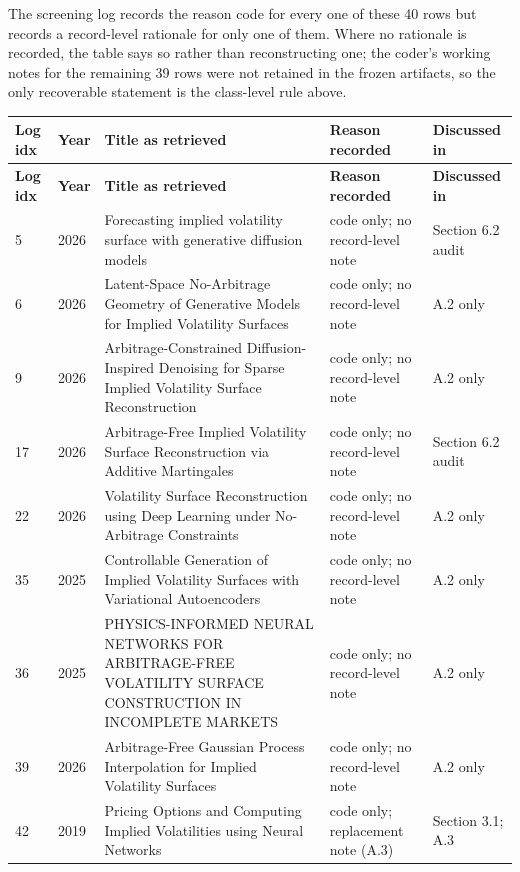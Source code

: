 \documentclass[11pt]{article}
\begin{document}
The screening log records the reason code for every one of these 40 rows but records a record-level rationale for only one of them. Where no rationale is recorded, the table says so rather than reconstructing one; the coder's working notes for the remaining 39 rows were not retained in the frozen artifacts, so the only recoverable statement is the class-level rule above.

\begingroup\small
\begin{longtable}{@{}p{}p{}p{}p{}p{}@{}}
\toprule
\textbf{Log idx} & \textbf{Year} & \textbf{Title as retrieved} & \textbf{Reason recorded} & \textbf{Discussed in} \\
\midrule
\endfirsthead
\toprule
\textbf{Log idx} & \textbf{Year} & \textbf{Title as retrieved} & \textbf{Reason recorded} & \textbf{Discussed in} \\
\midrule
\endhead
5 & 2026 & Forecasting implied volatility surface with generative diffusion models & code only; no record-level note & Section 6.2 audit \\
6 & 2026 & Latent-Space No-Arbitrage Geometry of Generative Models for Implied Volatility Surfaces & code only; no record-level note & A.2 only \\
9 & 2026 & Arbitrage-Constrained Diffusion-Inspired Denoising for Sparse Implied Volatility Surface Reconstruction & code only; no record-level note & A.2 only \\
17 & 2026 & Arbitrage-Free Implied Volatility Surface Reconstruction via Additive Martingales & code only; no record-level note & Section 6.2 audit \\
22 & 2026 & Volatility Surface Reconstruction using Deep Learning under No-Arbitrage Constraints & code only; no record-level note & A.2 only \\
35 & 2025 & Controllable Generation of Implied Volatility Surfaces with Variational Autoencoders & code only; no record-level note & A.2 only \\
36 & 2025 & PHYSICS-INFORMED NEURAL NETWORKS FOR ARBITRAGE-FREE VOLATILITY SURFACE CONSTRUCTION IN INCOMPLETE MARKETS & code only; no record-level note & A.2 only \\
39 & 2026 & Arbitrage-Free Gaussian Process Interpolation for Implied Volatility Surfaces & code only; no record-level note & A.2 only \\
42 & 2019 & Pricing Options and Computing Implied Volatilities using Neural Networks & code only; replacement note (A.3) & Section 3.1; A.3 \\

\end{longtable}
\end{document}
